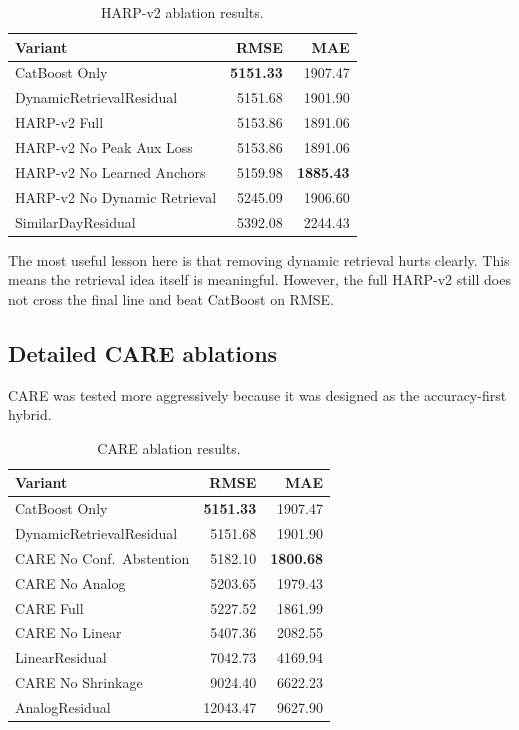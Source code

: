 \documentclass[conference]{IEEEtran}
\begin{document}
\begin{table}[t]
\caption{HARP-v2 ablation results.}
\label{tab:harp_ablation}
\centering
\begin{tabular}{p{3.2cm}rr}
\toprule
\textbf{Variant} & \textbf{RMSE} & \textbf{MAE} \\
\midrule
CatBoost Only & \textbf{5151.33} & 1907.47 \\
DynamicRetrievalResidual & 5151.68 & 1901.90 \\
HARP-v2 Full & 5153.86 & 1891.06 \\
HARP-v2 No Peak Aux Loss & 5153.86 & 1891.06 \\
HARP-v2 No Learned Anchors & 5159.98 & \textbf{1885.43} \\
HARP-v2 No Dynamic Retrieval & 5245.09 & 1906.60 \\
SimilarDayResidual & 5392.08 & 2244.43 \\
\bottomrule
\end{tabular}
\end{table}

The most useful lesson here is that removing dynamic retrieval hurts clearly. This means the retrieval idea itself is meaningful. However, the full HARP-v2 still does not cross the final line and beat CatBoost on RMSE.

\subsection{Detailed CARE ablations}
CARE was tested more aggressively because it was designed as the accuracy-first hybrid.

\begin{table}[t]
\caption{CARE ablation results.}
\label{tab:care_ablation}
\centering
\begin{tabular}{p{3.2cm}rr}
\toprule
\textbf{Variant} & \textbf{RMSE} & \textbf{MAE} \\
\midrule
CatBoost Only & \textbf{5151.33} & 1907.47 \\
DynamicRetrievalResidual & 5151.68 & 1901.90 \\
CARE No Conf.\ Abstention & 5182.10 & \textbf{1800.68} \\
CARE No Analog & 5203.65 & 1979.43 \\
CARE Full & 5227.52 & 1861.99 \\
CARE No Linear & 5407.36 & 2082.55 \\
LinearResidual & 7042.73 & 4169.94 \\
CARE No Shrinkage & 9024.40 & 6622.23 \\
AnalogResidual & 12043.47 & 9627.90 \\
\bottomrule
\end{tabular}
\end{table}
\end{document}
